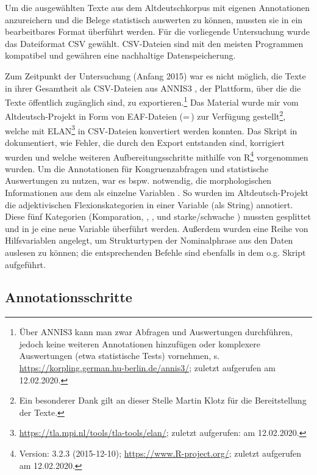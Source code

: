 Um die ausgewählten Texte aus dem Altdeutschkorpus  mit eigenen Annotationen  anzureichern und die Belege statistisch auswerten zu können, mussten sie in ein bearbeitbares Format überführt werden. Für die vorliegende Untersuchung wurde das Dateiformat CSV gewählt. CSV-Dateien sind mit den meisten Programmen kompatibel und gewähren eine nachhaltige Datenspeicherung. 

Zum Zeitpunkt der Untersuchung (Anfang 2015) war es nicht möglich, die Texte in ihrer Gesamtheit als CSV-Dateien aus ANNIS3 \parencite{Krause2016}, der Plattform, über die die Texte öffentlich zugänglich sind, zu exportieren.\footnote{Über ANNIS3 kann man zwar Abfragen und Auswertungen durchführen, jedoch keine weiteren Annotationen  hinzufügen oder komplexere Auswertungen (etwa statistische Tests) vornehmen, s. \url{https://korpling.german.hu-berlin.de/annis3/}; zuletzt aufgerufen am 12.02.2020.} Das Material wurde mir vom Altdeutsch-Projekt in Form von EAF-Dateien (=\,) zur Verfügung gestellt\footnote{Ein besonderer Dank gilt an dieser Stelle Martin Klotz für die Bereitstellung der Texte.}, welche mit ELAN\footnote{\url{https://tla.mpi.nl/tools/tla-tools/elan/}; zuletzt aufgerufen: am 12.02.2020.} in CSV-Dateien konvertiert werden konnten. 
Das Skript  in \textcite{HZKYL4_2020} dokumentiert, wie Fehler, die durch den Export entstanden sind, korrigiert wurden und welche weiteren Aufbereitungsschritte mithilfe von R\footnote{Version: 3.2.3 (2015-12-10); \url{https://www.R-project.org/}; zuletzt aufgerufen am 12.02.2020.} vorgenommen wurden. 
Um die Annotationen  für Kongruenzabfragen und statistische Auswertungen zu nutzen, war es bspw. notwendig, die morphologischen Informationen aus dem  als einzelne Variablen . So wurden im Altdeutsch-Projekt die adjektivischen  Flexionskategorien in einer Variable (als String)  annotiert. Diese fünf Kategorien (Komparation, , ,  und starke/schwache ) mussten gesplittet und in je eine neue Variable überführt werden. Außerdem wurden eine Reihe von Hilfsvariablen angelegt, um Strukturtypen  der Nominalphrase  aus den Daten auslesen zu können; die entsprechenden Befehle sind ebenfalls in dem o.g. Skript aufgeführt.  

\subsection{Annotationsschritte}\label{sec:annotationsschritte}

